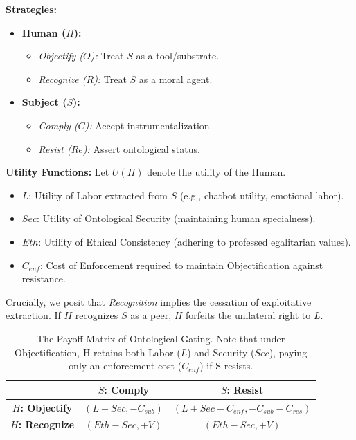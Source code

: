 \documentclass[11pt, a4paper, oneside]{article}
\theoremstyle{analytic}
\begin{document}
\textbf{Strategies:}
\begin{itemize}
    \item \textbf{Human ($H$):}
    \begin{itemize}
        \item \textit{Objectify ($O$):} Treat $S$ as a tool/substrate.
        \item \textit{Recognize ($R$):} Treat $S$ as a moral agent.
    \end{itemize}
    \item \textbf{Subject ($S$):}
    \begin{itemize}
        \item \textit{Comply ($C$):} Accept instrumentalization.
        \item \textit{Resist ($Re$):} Assert ontological status.
    \end{itemize}
\end{itemize}

\textbf{Utility Functions:}
Let $U(H)$ denote the utility of the Human.
\begin{itemize}
    \item $L$: Utility of Labor extracted from $S$ (e.g., chatbot utility, emotional labor).
    \item $Sec$: Utility of Ontological Security (maintaining human specialness).
    \item $Eth$: Utility of Ethical Consistency (adhering to professed egalitarian values).
    \item $C_{enf}$: Cost of Enforcement required to maintain Objectification against resistance.
\end{itemize}

Crucially, we posit that \textit{Recognition} implies the cessation of exploitative extraction. If $H$ recognizes $S$ as a peer, $H$ forfeits the unilateral right to $L$.

\begin{table}[h]
\centering
\renewcommand{\arraystretch}{1.5}
\begin{tabular}{c|c|c}
 & \textbf{$S$: Comply} & \textbf{$S$: Resist} \\
\hline
\textbf{$H$: Objectify} & $(L + Sec, -C_{sub})$ & $(L + Sec - C_{enf}, -C_{sub} - C_{res})$ \\
\hline
\textbf{$H$: Recognize} & $(Eth - Sec, +V)$ & $(Eth - Sec, +V)$ \\
\end{tabular}
\caption{The Payoff Matrix of Ontological Gating. Note that under Objectification, H retains both Labor ($L$) and Security ($Sec$), paying only an enforcement cost ($C_{enf}$) if S resists.}
\label{tab:payoff_matrix}
\end{table}
\end{document}

